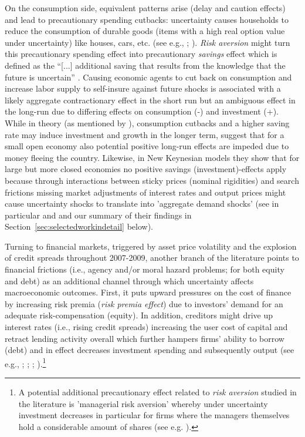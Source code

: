 \documentclass[a4paper,11pt,listof=nochaptergap,oneside,pointednumbers,bibtotoc,bigheadings,liststotoc,hidelinks]{scrbook}
\theoremstyle{mysatz}
\theoremstyle{mydefinition}
\theoremstyle{mytheorem}
\theoremstyle{mybemerkung}
\begin{document}
On the consumption side, equivalent patterns arise (delay and caution effects) and lead to precautionary spending cutbacks: uncertainty causes households to reduce the consumption of durable goods (items with a high real option value under uncertainty) like houses, cars, etc. (see e.g., \citealp{eberly:94}; \citealp{romer:90}). \textit{Risk aversion} might turn this precautionary spending effect into precautionary \textit{savings} effect which is defined as the ``[...] additional saving that results from the knowledge that the future is uncertain'' \citep[p. 2]{carrollandkimball:06}. Causing economic agents to cut back on consumption and increase labor supply to self-insure against future shocks is associated with a likely aggregate contractionary effect in the short run but an ambiguous effect in the long-run due to differing effects on consumption (-) and investment (+). While in theory (as mentioned by \citealp{bloom:14}), consumption cutbacks and a higher saving rate may induce investment and growth in the longer term, \citet{villaverdeetal:11} suggest that for a small open economy also potential positive long-run effects are impeded due to money fleeing the country. Likewise, in New Keynesian models they show that for large but more closed economies no positive savings (investment)-effects apply because through interactions between sticky prices (nominal rigidities) and search frictions missing market adjustments of interest rates and output prices might cause uncertainty shocks to translate into 'aggregate demand shocks' (see in particular \citealp{leducandliu:16} and \citealp{basuandbundick:17} and our summary of their findings in Section~\ref{sec:selectedworkindetail} below).

Turning to financial markets, triggered by asset price volatility and the explosion of credit spreads throughout 2007-2009, another branch of the literature points to financial frictions (i.e., agency and/or moral hazard problems; for both equity and debt) as an additional channel through which uncertainty affects macroeconomic outcomes. First, it puts upward pressures on the cost of finance by increasing risk premia (\textit{risk premia effect}) due to investors' demand for an adequate risk-compensation (equity). In addition, creditors might drive up interest rates (i.e., rising credit spreads) increasing the user cost of capital and retract lending activity overall which further hampers firms' ability to borrow (debt) and in effect decreases investment spending and subsequently output (see e.g., \citealp{gilchristetal:14}; \citealp{christianoetal:14}; \citealp{arenalloetal:11}; \citealp{arellanoetal:16}).\footnote{A potential additional precautionary effect related to \textit{risk aversion} studied in the literature is 'managerial risk aversion' whereby under uncertainty investment decreases in particular for firms where the managers themselves hold a considerable amount of shares (see e.g. \citealp{panousiandpananikolaou:12}).}\\
\end{document}
